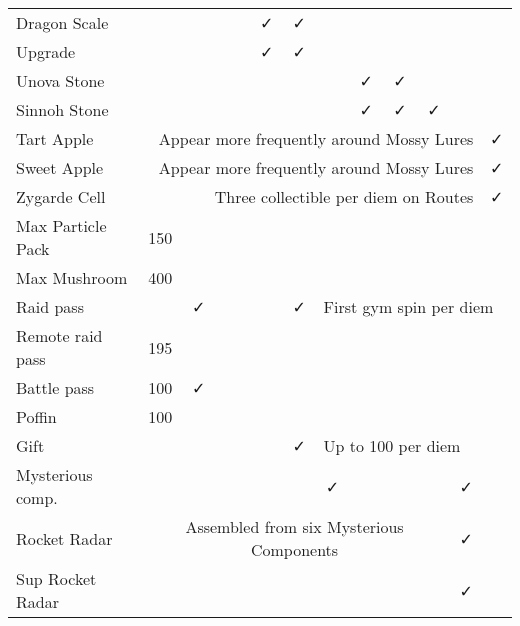 \documentclass[ebook,10pt,openany,oneside]{memoir}
\begin{document}
\begin{table}
\begin{tabular}{p{}cccccccccccc}
Dragon Scale      &      &   &     &    &  ✓ &  ✓  &     &     &   &   &   &   \\
Upgrade           &      &   &     &    &  ✓ &  ✓  &     &     &   &   &   &   \\
Unova Stone       &      &   &     &    &    &     &     &  ✓  & ✓ &   &   &   \\
Sinnoh Stone      &      &   &     &    &    &     &     &  ✓  & ✓ & ✓ &   &   \\
Tart Apple        & \multicolumn{11}{r}{Appear more frequently around Mossy Lures} & ✓ \\
Sweet Apple       & \multicolumn{11}{r}{Appear more frequently around Mossy Lures} & ✓ \\
Zygarde Cell      & \multicolumn{11}{r}{Three collectible per diem on Routes} & ✓ \\
Max Particle Pack & 150  &   &     &    &    &     &     &     &   &   &   &   \\
Max Mushroom      & 400  &   &     &    &    &     &     &     &   &   &   &   \\
Raid pass         &      & ✓ &     &    &    &  ✓  & \multicolumn{6}{l}{First gym spin per diem} \\
Remote raid pass  & 195  &   &     &    &    &     &     &     &   &   &   &   \\
Battle pass       & 100  & ✓ &     &    &    &     &     &     &   &   &   &   \\
Poffin            & 100  &   &     &    &    &     &     &     &   &   &   &   \\
Gift              &      &   &     &    &    &  ✓  & \multicolumn{6}{l}{Up to 100 per diem} \\
Mysterious comp.  &      &   &     &    &    &     &  ✓  &     &   &   & ✓ &   \\
Rocket Radar      & \multicolumn{10}{c}{Assembled from six Mysterious Components} & ✓ &   \\ %
Sup Rocket Radar  &      &   &     &    &    &     &     &     &   &   & ✓ &   \\

\end{tabular}
\end{table}
\end{document}
